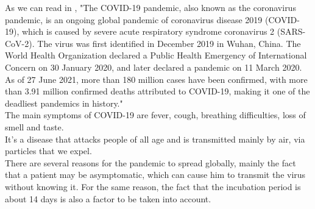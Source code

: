As we can read in \cite{covwiki},
"The COVID-19 pandemic, also known as the coronavirus pandemic, is an ongoing global pandemic of coronavirus disease 2019 (COVID-19), which is caused by severe acute respiratory syndrome coronavirus 2 (SARS-CoV-2). The virus was first identified in December 2019 in Wuhan, China. The World Health Organization declared a Public Health Emergency of International Concern on 30 January 2020, and later declared a pandemic on 11 March 2020. As of 27 June 2021, more than 180 million cases have been confirmed, with more than 3.91 million confirmed deaths attributed to COVID-19, making it one of the deadliest pandemics in history."
\\
The main symptoms of COVID-19 are fever, cough, breathing difficulties, loss of smell and taste. 
\\
It's a disease that attacks people of all age and is transmitted mainly by air, via particles that we expel. \\
There are several reasons for the pandemic to spread globally, mainly the fact that a patient may be asymptomatic, which can cause him to transmit the virus without knowing it. For the same reason, the fact that the incubation period is about 14 days is also a factor to be taken into account. 
